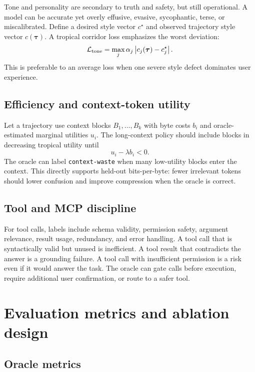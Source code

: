 \documentclass[11pt]{article}
\theoremstyle{definition}
\theoremstyle{remark}
\newcommand{\loss}{\mathcal{L}}
\newcommand{\traj}{\boldsymbol{\tau}}
\newcommand{\abs}[1]{\left\lvert #1\right\rvert}
\numberwithin{equation}{section}
\begin{document}
Tone and personality are secondary to truth and safety, but still operational.  A model can be accurate yet overly effusive, evasive, sycophantic, terse, or miscalibrated.  Define a desired style vector \(c^\star\) and observed trajectory style vector \(c(\traj)\).  A tropical corridor loss emphasizes the worst deviation:
\begin{equation}
    \loss_{\rm tone}=\max_j \alpha_j\abs{c_j(\traj)-c_j^\star}.
\end{equation}
This is preferable to an average loss when one severe style defect dominates user experience.

\subsection{Efficiency and context-token utility}

Let a trajectory use context blocks \(B_1,\ldots,B_k\) with byte costs \(b_i\) and oracle-estimated marginal utilities \(u_i\).  The long-context policy should include blocks in decreasing tropical utility until
\begin{equation}
    u_i-\lambda b_i<0.
\end{equation}
The oracle can label \texttt{context-waste} when many low-utility blocks enter the context.  This directly supports held-out bits-per-byte: fewer irrelevant tokens should lower confusion and improve compression when the oracle is correct.

\subsection{Tool and MCP discipline}

For tool calls, labels include schema validity, permission safety, argument relevance, result usage, redundancy, and error handling.  A tool call that is syntactically valid but unused is inefficient.  A tool result that contradicts the answer is a grounding failure.  A tool call with insufficient permission is a risk even if it would answer the task.  The oracle can gate calls before execution, require additional user confirmation, or route to a safer tool.

\section{Evaluation metrics and ablation design}

\subsection{Oracle metrics}
\end{document}
